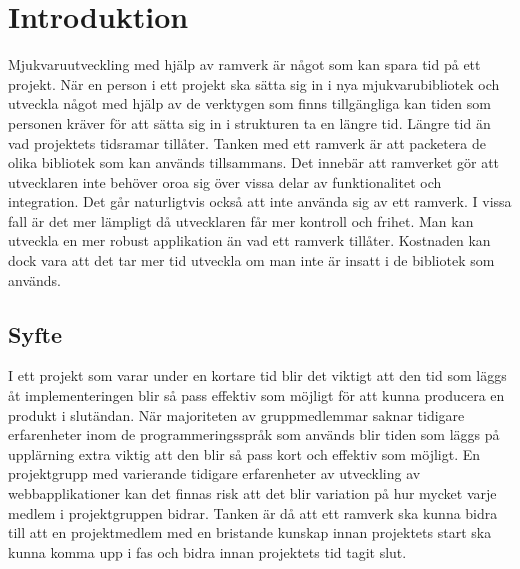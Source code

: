 \chapter{Introduktion}
\label{cha:johant_introduktion}
Mjukvaruutveckling med hjälp av ramverk är något som kan spara tid på ett projekt. När en person i ett projekt ska sätta sig in i nya mjukvarubibliotek och utveckla något med hjälp av de verktygen som finns tillgängliga kan tiden som personen kräver för att sätta sig in i strukturen ta en längre tid. Längre tid än vad projektets tidsramar tillåter. Tanken med ett ramverk är att packetera de olika bibliotek som kan används tillsammans. Det innebär att ramverket gör att utvecklaren inte behöver oroa sig över vissa delar av funktionalitet och integration. Det går naturligtvis också att inte använda sig av ett ramverk. I vissa fall är det mer lämpligt då utvecklaren får mer kontroll och frihet. Man kan utveckla en mer robust applikation än vad ett ramverk tillåter. Kostnaden kan dock vara att det tar mer tid utveckla om man inte är insatt i de bibliotek som används. 
\section{Syfte}
\label{sec:johant_syfte}
I ett projekt som varar under en kortare tid blir det viktigt att den tid som läggs åt implementeringen blir så pass effektiv som möjligt för att kunna producera en produkt i slutändan. När majoriteten av gruppmedlemmar saknar tidigare erfarenheter inom de programmeringsspråk som används blir tiden som läggs på upplärning extra viktig att den blir så pass kort och effektiv som möjligt. En projektgrupp med varierande tidigare erfarenheter av utveckling av webbapplikationer kan det finnas risk att det blir variation på hur mycket varje medlem i projektgruppen bidrar. Tanken är då att ett ramverk ska kunna bidra till att en projektmedlem med en bristande kunskap innan projektets start ska kunna komma upp i fas och bidra innan projektets tid tagit slut.
